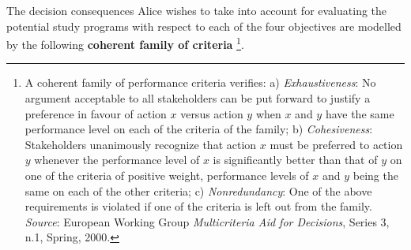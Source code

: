 The decision consequences Alice wishes to take into account for evaluating the potential study programs with respect to each of the four objectives are modelled by the following \textbf{coherent family of criteria} \footnote{A coherent family of performance criteria verifies: a) \emph{Exhaustiveness}: No argument acceptable to all stakeholders can be put forward to justify a preference in favour of action $x$ versus action $y$  when $x$ and $y$ have the same performance level on each of the criteria of the family; b) \emph{Cohesiveness}: Stakeholders unanimously recognize that action $x$ must be preferred to action $y$ whenever the performance level of $x$ is significantly better than that of $y$ on one of the criteria of positive weight, performance levels of $x$ and $y$ being the same on each of the other criteria; c) \emph{Nonredundancy}: One of the above requirements is violated if one of the criteria is left out from the family. \emph{Source}: European Working Group \emph{Multicriteria Aid for Decisions}, Series 3, n.1, Spring, 2000.}.

